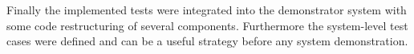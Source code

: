 Finally the implemented tests were integrated into the demonstrator system with some code restructuring of several components. Furthermore the system-level test cases were defined and can be a useful strategy before any system demonstration.


\vfill
\selectthesislanguage

\setcounter{romanPage}{\value{page}}
